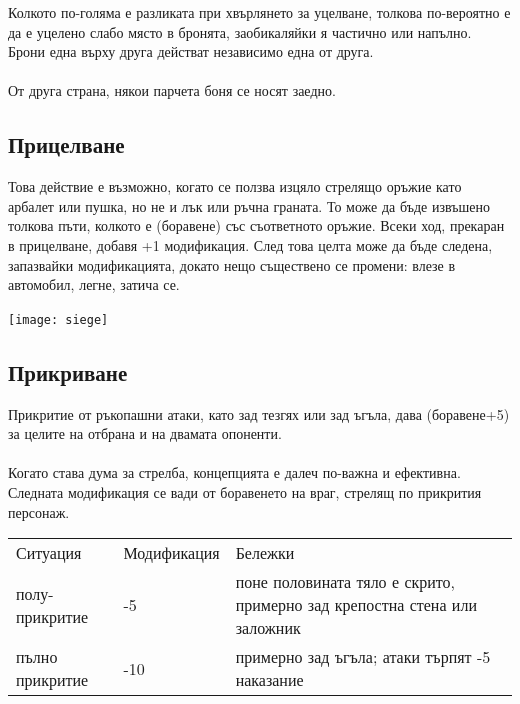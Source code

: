 Колкото по-голяма е разликата при хвърлянето за уцелване, толкова по-вероятно е да е уцелено слабо място в бронята, заобикаляйки я частично или напълно.
Брони една върху друга действат независимо една от друга.
\\
\\
От друга страна, някои парчета боня се носят заедно.
\\


\begin{multicols}{2}
\subsection{Прицелване}
Това действие е възможно, когато се ползва изцяло стрелящо оръжие като арбалет или пушка, но не и лък или ръчна граната.
То може да бъде извъшено толкова пъти, колкото е (боравене) със съответното оръжие.
Всеки ход, прекаран в прицелване, добавя +1 модификация.
След това целта може да бъде следена, запазвайки модификацията, докато нещо съществено се промени: влезе в автомобил, легне, затича се.


\texttt{[image: siege]}~


\subsection{Прикриване}
Прикритие от ръкопашни атаки, като зад тезгях или зад ъгъла, дава (боравене+5) за целите на отбрана и на двамата опоненти.
\\
\\
Когато става дума за стрелба, концепцията е далеч по-важна и ефективна.
Следната модификация се вади от боравенето на враг, стрелящ по прикрития персонаж.
\\
\begin{tabular}{p{2cm} | p{1cm} | p{5cm}}
Ситуация        & Модификация & Бележки \\
полу-прикритие  & -5          & поне половината тяло е скрито, примерно зад крепостна стена или заложник \\
пълно прикритие & -10         & примерно зад ъгъла; атаки търпят -5 наказание                            \\
\end{tabular}
\end{multicols}

